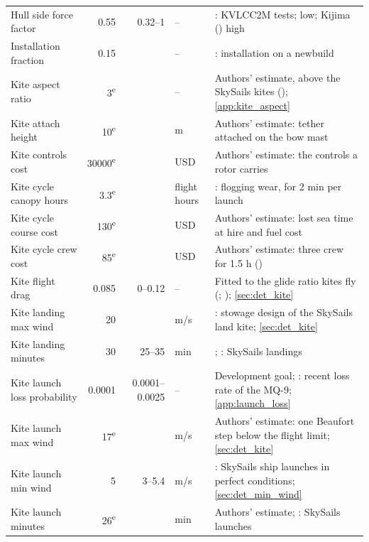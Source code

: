 \begin{longtable}{@{}>{\raggedright\arraybackslash}p{3.4cm}rr>{\raggedright\arraybackslash}p{1.4cm}>{\raggedright\arraybackslash}p{5.8cm}@{}}
Hull side force factor & \num{0.55} & \num{0.32}--\num{1} & -- & \citet{toxopeus2011}: KVLCC2M tests; \citet{vanderkolk2021} low; Kijima (\citealp{kim2021}) high \\
Installation fraction & \num{0.15} &  & -- & \citet[Table 7]{emsa2023}: installation on a newbuild \\
Kite aspect ratio & \num{3}\textsuperscript{e} &  & -- & Authors' estimate, above the SkySails kites (\citealp{paulig2013}); \cref{app:kite_aspect} \\
Kite attach height & \num{10}\textsuperscript{e} &  & m & Authors' estimate: tether attached on the bow mast \\
Kite controls cost & \num{30000}\textsuperscript{e} &  & USD & Authors' estimate: the controls a rotor carries \\
Kite cycle canopy hours & \num{3.3}\textsuperscript{e} &  & flight hours & \citet{northsails_durability}: flogging wear, for 2 min per launch \\
Kite cycle course cost & \num{130}\textsuperscript{e} &  & USD & Authors' estimate: lost sea time at hire and fuel cost \\
Kite cycle crew cost & \num{85}\textsuperscript{e} &  & USD & Authors' estimate: three crew for 1.5 h (\citealp{ilo2025wagescale}) \\
Kite flight drag & \num{0.085} & \num{0}--\num{0.12} & -- & Fitted to the glide ratio kites fly (\citealp{vandervlugt2019}; \citealp{erhard2013b}); \cref{sec:det_kite} \\
Kite landing max wind & \num{20} &  & m/s & \citet{skypower100_tib}: stowage design of the SkySails land kite; \cref{sec:det_kite} \\
Kite landing minutes & \num{30} & \num{25}--\num{35} & min & \citet{konstruktionspraxis_skysails}; \citet{skypower100_tib}: SkySails landings \\
Kite launch loss probability & \num{0.0001} & \num{0.0001}--\num{0.0025} & -- & Development goal; \citet{usaf2022mq9}: recent loss rate of the MQ-9; \cref{app:launch_loss} \\
Kite launch max wind & \num{17}\textsuperscript{e} &  & m/s & Authors' estimate: one Beaufort step below the flight limit; \cref{sec:det_kite} \\
Kite launch min wind & \num{5} & \num{3}--\num{5.4} & m/s & \citet{paulig2013}: SkySails ship launches in perfect conditions; \cref{sec:det_min_wind} \\
Kite launch minutes & \num{26}\textsuperscript{e} &  & min & Authors' estimate; \citet{konstruktionspraxis_skysails}: SkySails launches \\

\end{longtable}
